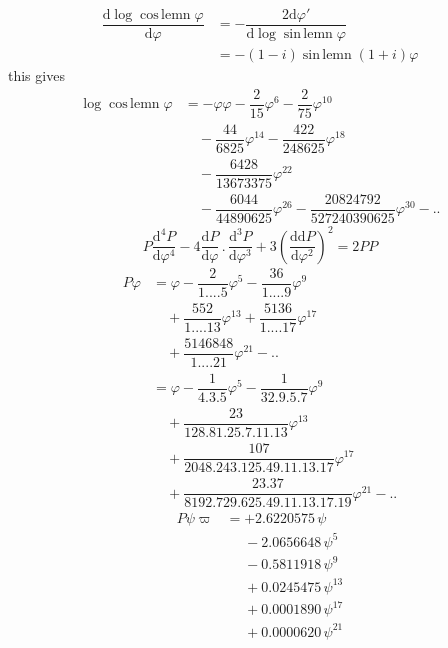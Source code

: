 \[
\begin{aligned}\dfrac{\mathrm d\log\operatorname{cos\,lemn}\varphi}{\mathrm d\varphi}
&=-\dfrac{2\mathrm d\varphi'}{\mathrm d\log\operatorname{sin\,lemn}\varphi}
\\[7pt]&=-(1-i)\operatorname{sin\,lemn}(1+i)\varphi\end{aligned}
\]
this gives
\[
\begin{aligned}
\log\operatorname{cos\,lemn}\varphi
&=-\varphi\varphi-\dfrac2{15}\varphi^6-\dfrac2{75}\varphi^{10}
\\[6pt]&\quad{}-\dfrac{44}{6825}\varphi^{14}-\dfrac{422}{248625}\varphi^{18}
\\[6pt]&\quad{}-\dfrac{6428}{13673375}\varphi^{22}\\[6pt]
&\quad-\dfrac{6044}{44890625}\varphi^{26}
-\dfrac{20824792}{527240390625}\varphi^{30}-\mathord{.}\mathord{.}
\end{aligned}
\]
\[
P\dfrac{\mathrm d^4P}{\mathrm d\varphi^4}
-4\dfrac{\mathrm dP}{\mathrm d\varphi}\, .\,\dfrac{\mathrm d^3P}{\mathrm d\varphi^3}
+3\left(\dfrac{\mathrm d\mathrm dP}{\mathrm d\varphi^2}\right)^2=2PP
\]
\[
\begin{aligned}
P\varphi&=\varphi-\dfrac2{1\mathord{.}\mathord{.}\mathord{.}\mathord{.}5}\varphi^5
-\dfrac{36}{1\mathord{.}\mathord{.}\mathord{.}\mathord{.}9}\varphi^9
\\[6pt]&\quad{}+\dfrac{552}{1\mathord{.}\mathord{.}\mathord{.}\mathord{.}13}\varphi^{13}
+\dfrac{5136}{1\mathord{.}\mathord{.}\mathord{.}\mathord{.}17}\varphi^{17}
\\[6pt]&\quad{}+\dfrac{5146848}{1\mathord{.}\mathord{.}\mathord{.}\mathord{.}21}\varphi^{21}-\mathord{.}\mathord{.}\\[6pt]
&=\varphi-\dfrac1{4.3.5}\varphi^5-\dfrac1{32.9.5.7}\varphi^9
\\[6pt]&\quad{}+\dfrac{23}{128.81.25.7.11.13}\varphi^{13}
\\[6pt]&\quad{}+\dfrac{107}{2048.243.125.49.11.13.17}\varphi^{17}\\[6pt]
&\quad+\dfrac{23.37}{8192.729.625.49.11.13.17.19}\varphi^{21}-\mathord{.}\mathord{.}
\end{aligned}
\]
\[
\begin{aligned}
P\psi\varpi&=+2.6220575\,\psi\\
&\phantom{{}={}}-2.0656648\,\psi^5\\
&\phantom{{}={}}-0.5811918\,\psi^9\\
&\phantom{{}={}}+0.0245475\,\psi^{13}\\
&\phantom{{}={}}+0.0001890\,\psi^{17}\\
&\phantom{{}={}}+0.0000620\,\psi^{21}
\end{aligned}
\]
